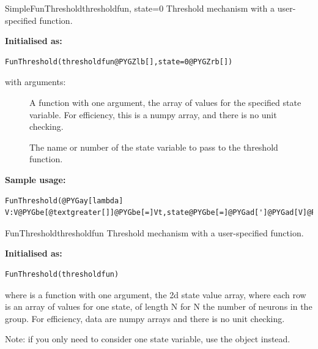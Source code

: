 \documentclass[letterpaper,10pt,english]{manual}
\begin{document}
\hypertarget{brian.SimpleFunThreshold}{}\begin{classdesc}{SimpleFunThreshold}{thresholdfun, state=0}
Threshold mechanism with a user-specified function.

\textbf{Initialised as:}

\begin{Verbatim}[commandchars=@\[\]]
FunThreshold(thresholdfun@PYGZlb[],state=0@PYGZrb[])
\end{Verbatim}

with arguments:
\begin{description}
\item[]
A function with one argument, the array of values for
the specified state variable. For efficiency, this is
a numpy array, and there is no unit checking.

\item[]
The name or number of the state variable to pass to
the threshold function.

\end{description}

\textbf{Sample usage:}

\begin{Verbatim}[commandchars=@\[\]]
FunThreshold(@PYGay[lambda] V:V@PYGbe[@textgreater[]]@PYGbe[=]Vt,state@PYGbe[=]@PYGad[']@PYGad[V]@PYGad['])
\end{Verbatim}
\end{classdesc}

\hypertarget{brian.FunThreshold}{}\begin{classdesc}{FunThreshold}{thresholdfun}
Threshold mechanism with a user-specified function.

\textbf{Initialised as:}

\begin{Verbatim}[commandchars=@\[\]]
FunThreshold(thresholdfun)
\end{Verbatim}

where  is a function with one argument,
the 2d state value array, where each row is an array of
values for one state, of length N for N the number of
neurons in the group. For efficiency, data are numpy
arrays and there is no unit checking.

Note: if you only need to consider one state variable,
use the \hyperlink{brian.SimpleFunThreshold}{} object instead.
\end{classdesc}
\end{document}
